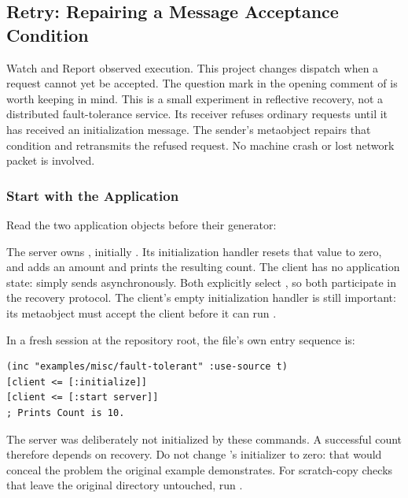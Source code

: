 \subsection{Retry: Repairing a Message Acceptance Condition}
\label{sec:retry}

Watch and Report observed execution. This project changes dispatch when
a request cannot yet be accepted. The question mark in the opening comment of
 is worth keeping in mind.
This is a small experiment in reflective recovery, not a distributed
fault-tolerance service. Its receiver refuses ordinary requests until it
has received an initialization message. The sender's metaobject repairs
that condition and retransmits the refused request.
No machine crash or lost network packet is involved.

\subsubsection{Start with the Application}

Read the two application objects before their generator:


The server owns , initially . Its initialization
handler resets that value to zero, and \code{[:count-up n]} adds an amount
and prints the resulting count. The client has no application state:
 simply sends \code{[:count-up 10]} asynchronously.
Both explicitly select , so both participate in the
recovery protocol. The client's empty initialization handler is still
important: its metaobject must accept the client before it can run
.

In a fresh session at the repository root, the file's own entry sequence is:

\begin{codeblock}
\begin{lstlisting}
(inc "examples/misc/fault-tolerant" :use-source t)
[client <= [:initialize]]
[client <= [:start server]]
; Prints Count is 10.
\end{lstlisting}
\end{codeblock}

The server was deliberately not initialized by these commands. A successful
count therefore depends on recovery. Do not change 's initializer
to zero: that would conceal the problem the original example demonstrates.
For scratch-copy checks that leave the original directory untouched, run
.

